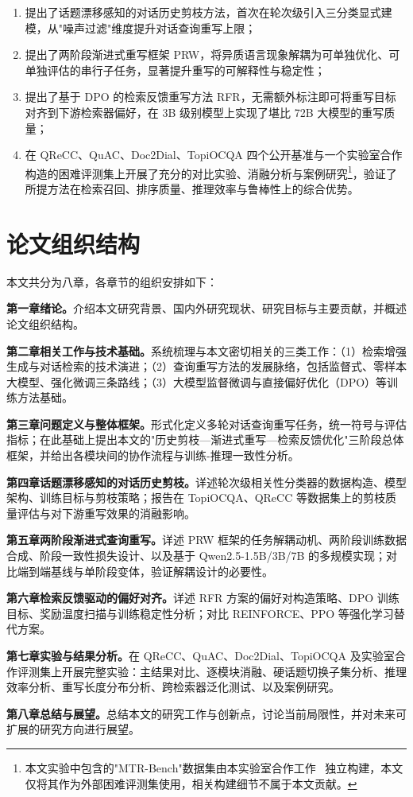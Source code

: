 \begin{enumerate}
    \item 提出了话题漂移感知的对话历史剪枝方法，首次在轮次级引入三分类显式建模，从"噪声过滤"维度提升对话查询重写上限；
    \item 提出了两阶段渐进式重写框架 PRW，将异质语言现象解耦为可单独优化、可单独评估的串行子任务，显著提升重写的可解释性与稳定性；
    \item 提出了基于 DPO 的检索反馈重写方法 RFR，无需额外标注即可将重写目标对齐到下游检索器偏好，在 3B 级别模型上实现了堪比 72B 大模型的重写质量；
    \item 在 QReCC、QuAC、Doc2Dial、TopiOCQA 四个公开基准与一个实验室合作构造的困难评测集上开展了充分的对比实验、消融分析与案例研究\footnote{本文实验中包含的"MTR-Bench"数据集由本实验室合作工作~\citep{mtrsuite2025} 独立构建，本文仅将其作为外部困难评测集使用，相关构建细节不属于本文贡献。}，验证了所提方法在检索召回、排序质量、推理效率与鲁棒性上的综合优势。
\end{enumerate}

\section{论文组织结构}

本文共分为八章，各章节的组织安排如下：

\textbf{第一章\quad 绪论。}介绍本文研究背景、国内外研究现状、研究目标与主要贡献，并概述论文组织结构。

\textbf{第二章\quad 相关工作与技术基础。}系统梳理与本文密切相关的三类工作：（1）检索增强生成与对话检索的技术演进；（2）查询重写方法的发展脉络，包括监督式、零样本大模型、强化微调三条路线；（3）大模型监督微调与直接偏好优化（DPO）等训练方法基础。

\textbf{第三章\quad 问题定义与整体框架。}形式化定义多轮对话查询重写任务，统一符号与评估指标；在此基础上提出本文的"历史剪枝—渐进式重写—检索反馈优化"三阶段总体框架，并给出各模块间的协作流程与训练-推理一致性分析。

\textbf{第四章\quad 话题漂移感知的对话历史剪枝。}详述轮次级相关性分类器的数据构造、模型架构、训练目标与剪枝策略；报告在 TopiOCQA、QReCC 等数据集上的剪枝质量评估与对下游重写效果的消融影响。

\textbf{第五章\quad 两阶段渐进式查询重写。}详述 PRW 框架的任务解耦动机、两阶段训练数据合成、阶段一致性损失设计、以及基于 Qwen2.5-1.5B/3B/7B 的多规模实现；对比端到端基线与单阶段变体，验证解耦设计的必要性。

\textbf{第六章\quad 检索反馈驱动的偏好对齐。}详述 RFR 方案的偏好对构造策略、DPO 训练目标、奖励温度扫描与训练稳定性分析；对比 REINFORCE、PPO 等强化学习替代方案。

\textbf{第七章\quad 实验与结果分析。}在 QReCC、QuAC、Doc2Dial、TopiOCQA 及实验室合作评测集上开展完整实验：主结果对比、逐模块消融、硬话题切换子集分析、推理效率分析、重写长度分布分析、跨检索器泛化测试、以及案例研究。

\textbf{第八章\quad 总结与展望。}总结本文的研究工作与创新点，讨论当前局限性，并对未来可扩展的研究方向进行展望。
